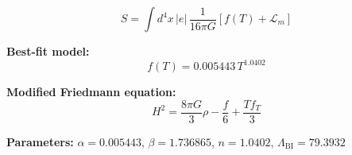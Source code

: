 
\begin{equation}
  S = \int d^4x \, |e| \, \frac{1}{16\pi G} \left[ f(T) + \mathcal{L}_m \right]
\end{equation}

\textbf{Best-fit model:}
\begin{equation}
  f(T) = 0.005443 \, T^{1.0402}
\end{equation}

\textbf{Modified Friedmann equation:}
\begin{equation}
  H^2 = \frac{8\pi G}{3} \rho - \frac{f}{6} + \frac{T f_T}{3}
\end{equation}

\textbf{Parameters:}
$\alpha = 0.005443$, \quad
$\beta = 1.736865$, \quad
$n = 1.0402$, \quad
$\Lambda_{\text{BI}} = 79.3932$